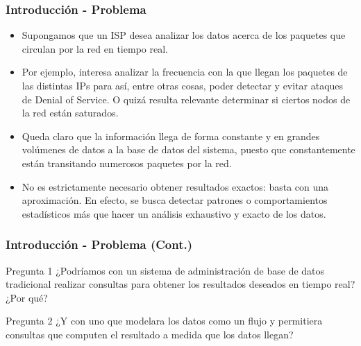 \begin{frame}
\frametitle{Introducción - Problema}
\begin{itemize}
\item Supongamos que un ISP desea analizar los datos acerca de los paquetes que circulan por la red en tiempo real.
\item Por ejemplo, interesa analizar la frecuencia con la que llegan los paquetes de las distintas IPs para así, entre otras cosas, poder detectar y evitar ataques de Denial of Service. O quizá resulta relevante determinar si ciertos nodos de la red están saturados. 
\item Queda claro que la información llega de forma constante y en grandes volúmenes de datos a la base de datos del sistema, puesto que constantemente están transitando numerosos paquetes por la red.
\item No es estrictamente necesario obtener resultados exactos: basta con una aproximación. En efecto, se busca detectar patrones o comportamientos estadísticos más que hacer un análisis exhaustivo y exacto de los datos.
\end{itemize}
\end{frame}

\begin{frame}
\frametitle{Introducción - Problema (Cont.)}
\begin{block}{Pregunta 1}
¿Podríamos con un sistema de administración de base de datos tradicional realizar consultas para obtener los resultados deseados en tiempo real? ¿Por qué?
\end{block}
\begin{block}{Pregunta 2}
¿Y con uno que modelara los datos como un flujo y permitiera consultas que computen el resultado a medida que los datos llegan?
\end{block}
\end{frame}

